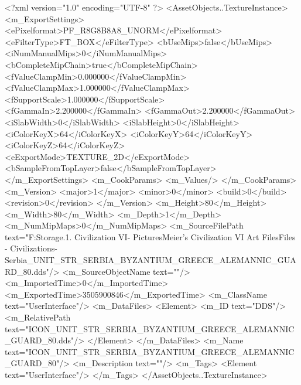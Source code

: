 <?xml version="1.0" encoding="UTF-8" ?>
<AssetObjects..TextureInstance>
	<m_ExportSettings>
		<ePixelformat>PF_R8G8B8A8_UNORM</ePixelformat>
		<eFilterType>FT_BOX</eFilterType>
		<bUseMips>false</bUseMips>
		<iNumManualMips>0</iNumManualMips>
		<bCompleteMipChain>true</bCompleteMipChain>
		<fValueClampMin>0.000000</fValueClampMin>
		<fValueClampMax>1.000000</fValueClampMax>
		<fSupportScale>1.000000</fSupportScale>
		<fGammaIn>2.200000</fGammaIn>
		<fGammaOut>2.200000</fGammaOut>
		<iSlabWidth>0</iSlabWidth>
		<iSlabHeight>0</iSlabHeight>
		<iColorKeyX>64</iColorKeyX>
		<iColorKeyY>64</iColorKeyY>
		<iColorKeyZ>64</iColorKeyZ>
		<eExportMode>TEXTURE_2D</eExportMode>
		<bSampleFromTopLayer>false</bSampleFromTopLayer>
	</m_ExportSettings>
	<m_CookParams>
		<m_Values/>
	</m_CookParams>
	<m_Version>
		<major>1</major>
		<minor>0</minor>
		<build>0</build>
		<revision>0</revision>
	</m_Version>
	<m_Height>80</m_Height>
	<m_Width>80</m_Width>
	<m_Depth>1</m_Depth>
	<m_NumMipMaps>0</m_NumMipMaps>
	<m_SourceFilePath text="F:\Mod Storage\2.1. Civilization VI\Mods\Archive - Pictures\Sid Meier's Civilization VI Art Files\Art Files - Civilizations\Civilization - Serbia\ICON_UNIT_STR_SERBIA_BYZANTIUM_GREECE_ALEMANNIC_GUARD_80.dds"/>
	<m_SourceObjectName text=""/>
	<m_ImportedTime>0</m_ImportedTime>
	<m_ExportedTime>3505900846</m_ExportedTime>
	<m_ClassName text="UserInterface"/>
	<m_DataFiles>
		<Element>
			<m_ID text="DDS"/>
			<m_RelativePath text="ICON_UNIT_STR_SERBIA_BYZANTIUM_GREECE_ALEMANNIC_GUARD_80.dds"/>
		</Element>
	</m_DataFiles>
	<m_Name text="ICON_UNIT_STR_SERBIA_BYZANTIUM_GREECE_ALEMANNIC_GUARD_80"/>
	<m_Description text=""/>
	<m_Tags>
		<Element text="UserInterface"/>
	</m_Tags>
</AssetObjects..TextureInstance>

